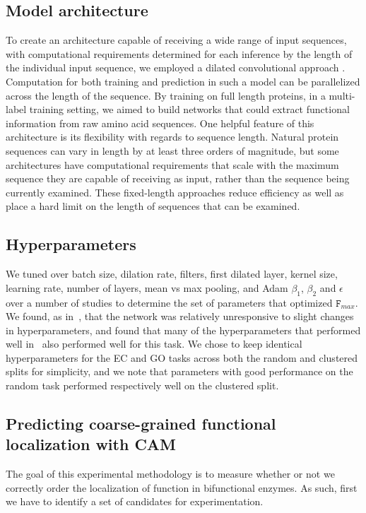 \subsection*{Model architecture}
To create an architecture capable of receiving a wide range of input sequences, with computational requirements determined for each inference by the length of the individual input sequence, we employed a dilated convolutional approach \citep{dilatedconvolutions}. Computation for both training and prediction in such a model can be parallelized across the length of the sequence. By training on full length proteins, in a multi-label training setting, we aimed to build networks that could  extract functional information from raw amino acid sequences. One helpful feature of this architecture is its flexibility with regards to sequence length. Natural protein sequences can vary in length by at least three orders of magnitude, but some architectures have computational requirements that scale with the maximum sequence they are capable of receiving as input, rather than the sequence being currently examined. These fixed-length approaches reduce efficiency as well as place a hard limit on the length of sequences that can be examined. 

\subsection*{Hyperparameters}
We tuned over batch size, dilation rate, filters, first dilated layer, kernel size, learning rate, number of layers, mean vs max pooling, and Adam $\beta_1$, $\beta_2$ and $\epsilon$~\citep{kingma2014adam} over a number of studies to determine the set of parameters that optimized $\texttt{F}_{max}$. We found, as in~\cite{bileschi}, that the network was relatively unresponsive to slight changes in hyperparameters, and found that many of the hyperparameters that performed well in~\cite{bileschi} also performed well for this task. We chose to keep identical hyperparameters for the EC and GO tasks across both the random and clustered splits for simplicity, and we note that parameters with good performance on the random task performed respectively well on the clustered split. 


\subsection*{Predicting coarse-grained functional localization with CAM}
The goal of this experimental methodology is to measure whether or not we correctly order the localization of function in bifunctional enzymes. As such, first we have to identify a set of candidates for experimentation.

